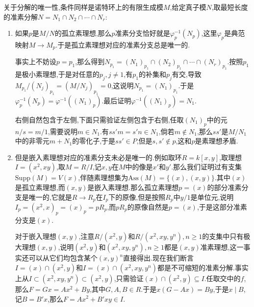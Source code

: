 关于分解的唯一性,条件同样是诺特环上的有限生成模$M$,给定真子模$N$,取最短长度的准素分解$N=N_1\cap N_2\cap\cdots\cap N_r$:
\begin{enumerate}
	\item 如果$p$是$M/N$的孤立素理想,那么$p$准素分支恰好就是$\varphi_p^{-1}(N_p)$,这里$\varphi_p$是典范映射$M\to M_p$.于是孤立素理想对应的准素分支总是唯一的.
	
	事实上不妨设$p=p_1$,那么得到$N_{p_1}=(N_1)_{p_1}\cap(N_2)_{p_1}\cap\cdots\cap(N_r)_{p_1}$.按照$p_1$是极小素理想,于是对任意的$p_j,j\not=1$,有$p_1$的补集和$p_j$有交,导致$M_{p_1}/(N_j)_{p_1}=(M/N_j)_{p_1}=0$,这说明$N_{p_1}=(N_1)_{p_1}$.于是$\varphi_p^{-1}(N_p)=\varphi^{-1}((N_1)_p)$.最后证明$\varphi^{-1}((N_1)_p)=N_1$.
	
	右侧自然包含于左侧,下面只需验证左侧包含于右侧,任取$(N_1)_p$中的元$n/s=m/1$,需要说明$m\in N_1$.有$ss'm=s'n\in N_1$,倘若$m\not\in N_1$,那么$ss'$是$M/N_1$中的非零元$m+N_1$的零化子,于是$ss'\in P$,但是$s,s'\not\in p$,这和$p$是素理想矛盾.
	\item 但是嵌入素理想对应的准素分支未必是唯一的.例如取环$R=k[x,y]$,取理想$I=(x^2,xy)$,取$M=R/I$,记$x,y$在$M$中的像是$x'$和$y'$.那么我们证明过有支集$\mathrm{Supp}(M)=V(x)$,伴随素理想集为$\mathrm{Ass}(M)=\{(x),(x,y)\}$.其中$(x)$是孤立素理想,而$(x,y)$是嵌入素理想.那么孤立素理想$p=(x)$的部分准素分支是唯一的,它就是$R\to R_p$在$I_p$下的原像,但是按照$R_p$中$y/1$是单位元,说明$I_p=(x^2,x)_p=(x)_p=pR_p$,而$pR_p$的原像自然是$p=(x)$,于是这部分准素分支是$(x)$.
	
	对于嵌入理想$(x,y)$,注意$R/(x^2,y)$和$R/(x^2,xy,y^n),n\ge1$的支集中只有极大理想$(x,y)$,说明$(x^2,y)$和$(x^2,xy,y^n),n\ge1$都是$(x,y)$准素理想,这一事实还可以从它们均包含某个$(x,y)^n$直接得出.现在我们断言$I=(x)\cap(x^2,y)$和$I=(x)\cap(x^2,xy,y^n)$都是不可缩短的准素分解.事实上从$I\subset(x^2,xy,y^n)\subset(x^2,y)$,只需验证$(x)\cap(x^2,y)\subseteq I$.任取交中的$f$,那么$F=Gx=Ax^2+By$,其中$G,A,B\in R$.于是$x(G-Ax)=By$,于是$x\mid B$,记$B=B'x$,那么$F=Ax^2+B'xy\in I$.
\end{enumerate}

